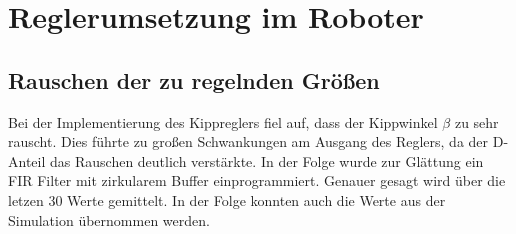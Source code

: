 \renewcommand{\autoren}{Timo Veit, Aleksandar Stoiljkovic}
\newpage
\section{Reglerumsetzung im Roboter}
\subsection{Rauschen der zu regelnden Größen}
Bei der Implementierung des Kippreglers fiel auf, dass der Kippwinkel $\beta$ zu sehr rauscht. Dies führte zu großen Schwankungen am Ausgang des Reglers, da der D-Anteil das Rauschen deutlich verstärkte. In der Folge wurde zur Glättung ein FIR Filter mit zirkularem Buffer einprogrammiert. Genauer gesagt wird über die letzen 30 Werte gemittelt.
In der Folge konnten auch die Werte aus der Simulation übernommen werden. 

